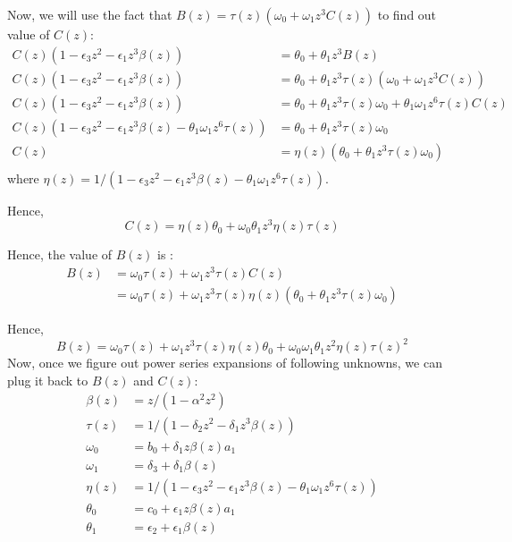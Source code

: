 \documentclass[11pt,a4paper]{article}
\begin{document}
Now, we will use the fact that $B(z)  =  \tau(z) ( \omega_0+    \omega_1 z^3 C(z) )$ to find out value of $C(z)$:
\begin{align*}
C(z)(1 - \epsilon_3 z^2 - \epsilon_1  z^3   \beta(z))  &=  \theta_0+ \theta_1  z^3 B(z) \\
C(z)(1 - \epsilon_3 z^2 - \epsilon_1  z^3   \beta(z))  &=  \theta_0+ \theta_1  z^3 \tau(z) ( \omega_0+    \omega_1 z^3 C(z) ) \\
C(z)(1 - \epsilon_3 z^2 - \epsilon_1  z^3   \beta(z))  &=  \theta_0+ \theta_1  z^3 \tau(z)  \omega_0 + \theta_1   \omega_1  z^6 \tau(z)    C(z) \\
C(z)(1 - \epsilon_3 z^2 - \epsilon_1  z^3   \beta(z) -\theta_1   \omega_1  z^6 \tau(z)   )  &=  \theta_0+ \theta_1  z^3 \tau(z)  \omega_0  \\
C(z)  &=  \eta(z)( \theta_0+ \theta_1  z^3 \tau(z)  \omega_0 ) \\
\end{align*}
where $\eta(z)=1/(1 - \epsilon_3 z^2 - \epsilon_1  z^3   \beta(z) -\theta_1   \omega_1  z^6 \tau(z)   )$.

Hence, 
\begin{equation}
\boxed{C(z)  =  \eta(z) \theta_0+  \omega_0 \theta_1  z^3 \eta(z) \tau(z)   }
\end{equation}

Hence, the value of $B(z)$ is :
\begin{align*}
B(z)  &=    \omega_0 \tau(z) +    \omega_1 z^3  \tau(z) C(z) \\
&= \omega_0 \tau(z) +    \omega_1 z^3  \tau(z) \eta(z)( \theta_0+ \theta_1  z^3 \tau(z)  \omega_0 ) 
\end{align*}


Hence, 
\begin{equation}
\boxed{B(z)  = \omega_0 \tau(z) +    \omega_1 z^3  \tau(z) \eta(z) \theta_0 + \omega_0 \omega_1  \theta_1    z^2 \eta(z)  \tau(z) ^2   }
\end{equation}
Now, once we figure out  power series expansions of following unknowns, we can plug it back to $B(z)$ and $C(z)$:
\begin{align*}
\beta(z) &= z/(1 -\alpha^2  z^2 ) \\
 \tau(z) &= 1/ (1 - \delta_2 z^2 -\delta_1  z^3   \beta(z) )\\
 \omega_0 &= b_0 +  \delta_1  z   \beta(z)  a_1  \\
 \omega_1 &= \delta_3 +  \delta_1     \beta(z)\\
 \eta(z)&=1/(1 - \epsilon_3 z^2 - \epsilon_1  z^3   \beta(z) -\theta_1   \omega_1  z^6 \tau(z)   )\\
 \theta_0&= c_0 +  \epsilon_1  z \beta(z) a_1\\
 \theta_1&= \epsilon_2 + \epsilon_1   \beta(z)
\end{align*}
\end{document}
